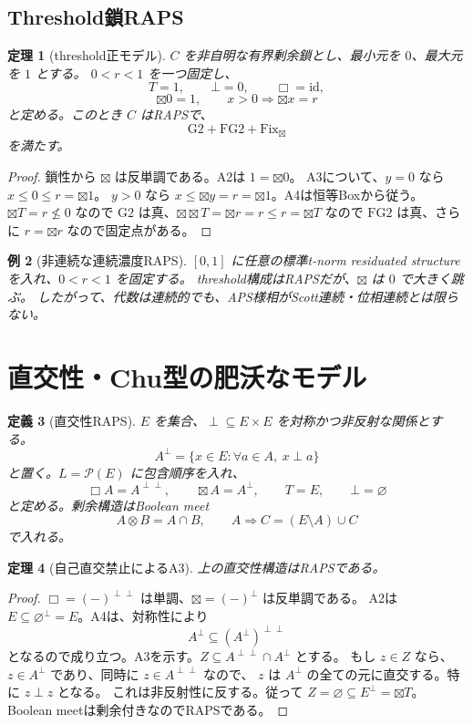 \documentclass[uplatex,dvipdfmx,a4paper,10pt]{jsarticle}
\newtheorem{theorem}{定理}
\newtheorem{definition}[theorem]{定義}
\newtheorem{example}[theorem]{例}
\newcommand{\Gtwo}{\mathrm{G2}}
\newcommand{\FGtwo}{\mathrm{FG2}}
\newcommand{\Fix}{\mathrm{Fix}}
\newcommand{\bt}{\boxtimes}
\newcommand{\Pow}{\mathcal P}
\begin{document}
\subsection{Threshold鎖RAPS}

\begin{theorem}[threshold正モデル]
\(C\) を非自明な有界剰余鎖とし、最小元を \(0\)、最大元を \(1\) とする。
\(0<r<1\) を一つ固定し、
\[
T=1,\qquad \bot=0,\qquad \Box=\mathrm{id},
\]
\[
\bt0=1,\qquad
x>0\Rightarrow \bt x=r
\]
と定める。このとき \(C\) はRAPSで、
\[
\Gtwo+\FGtwo+\Fix_{\bt}
\]
を満たす。
\end{theorem}

\begin{proof}
鎖性から \(\bt\) は反単調である。A2は \(1=\bt0\)。
A3について、\(y=0\) なら \(x\le0\le r=\bt1\)。
\(y>0\) なら \(x\le\bt y=r=\bt1\)。A4は恒等Boxから従う。
\(\bt T=r\nleq0\) なので \(\Gtwo\) は真、\(\bt\bt T=\bt r=r\le r=\bt T\) なので
\(\FGtwo\) は真、さらに \(r=\bt r\) なので固定点がある。
\end{proof}

\begin{example}[非連続な連続濃度RAPS]
\([0,1]\) に任意の標準t-norm residuated structureを入れ、\(0<r<1\) を固定する。
threshold構成はRAPSだが、\(\bt\) は \(0\) で大きく跳ぶ。
したがって、代数は連続的でも、APS様相がScott連続・位相連続とは限らない。
\end{example}

\section{直交性・Chu型の肥沃なモデル}

\begin{definition}[直交性RAPS]
\(E\) を集合、\(\perp\subseteq E\times E\) を対称かつ非反射な関係とする。
\[
A^\perp=\{x\in E:\forall a\in A,\ x\perp a\}
\]
と置く。\(L=\Pow(E)\) に包含順序を入れ、
\[
\Box A=A^{\perp\perp},\qquad
\bt A=A^\perp,\qquad
T=E,\qquad \bot=\varnothing
\]
と定める。剰余構造はBoolean meet
\[
A\otimes B=A\cap B,\qquad A\Rightarrow C=(E\setminus A)\cup C
\]
で入れる。
\end{definition}

\begin{theorem}[自己直交禁止によるA3]
上の直交性構造はRAPSである。
\end{theorem}

\begin{proof}
\(\Box=(-)^{\perp\perp}\) は単調、\(\bt=(-)^\perp\) は反単調である。
A2は \(E\subseteq\varnothing^\perp=E\)。A4は、対称性により
\[
A^\perp\subseteq (A^\perp)^{\perp\perp}
\]
となるので成り立つ。A3を示す。\(Z\subseteq A^{\perp\perp}\cap A^\perp\) とする。
もし \(z\in Z\) なら、\(z\in A^\perp\) であり、同時に \(z\in A^{\perp\perp}\) なので、
\(z\) は \(A^\perp\) の全ての元に直交する。特に \(z\perp z\) となる。
これは非反射性に反する。従って \(Z=\varnothing\subseteq E^\perp=\bt T\)。
Boolean meetは剰余付きなのでRAPSである。
\end{proof}
\end{document}
